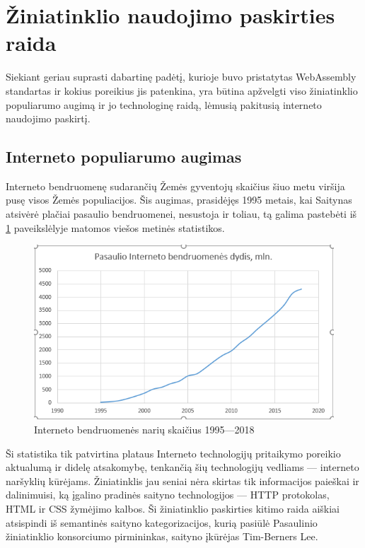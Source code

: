 \documentclass{VUMIFPSkursinis}
\begin{document}
\section{Žiniatinklio naudojimo paskirties raida}

Siekiant geriau suprasti dabartinę padėtį, kurioje buvo pristatytas WebAssembly standartas ir kokius poreikius jis patenkina, yra būtina apžvelgti viso žiniatinklio populiarumo augimą ir jo technologinę raidą, lėmusią pakitusią interneto naudojimo paskirtį.

\subsection{Interneto populiarumo augimas}

Interneto bendruomenę sudarančių Žemės gyventojų skaičius šiuo metu viršija pusę visos Žemės populiacijos. Šis augimas, prasidėjęs 1995 metais, kai Saitynas atsivėrė plačiai pasaulio bendruomenei, nesustoja ir toliau, tą galima pastebėti iš \ref{fig:internet_usage} paveikslėlyje matomos viešos metinės statistikos.

\begin{figure}[h!]
  \includegraphics[scale=1]{interneto_naudojimo_statistika.png}
  \caption{Interneto bendruomenės narių skaičius 1995—2018 \cite{IWS19}}
  \label{fig:internet_usage}
\end{figure}

Ši statistika tik patvirtina plataus Interneto technologijų pritaikymo poreikio aktualumą ir didelę atsakomybę, tenkančią šių technologijų vedliams — interneto naršyklių kūrėjams. Žiniatinklis jau seniai nėra skirtas tik informacijos paieškai ir dalinimuisi, ką įgalino pradinės saityno technologijos — HTTP protokolas, HTML ir CSS žymėjimo kalbos. Ši žiniatinklio paskirties kitimo raida aiškiai atsispindi iš semantinės saityno kategorizacijos, kurią pasiūlė Pasaulinio žiniatinklio konsorciumo pirmininkas, saityno įkūrėjas Tim-Berners Lee.
\end{document}
